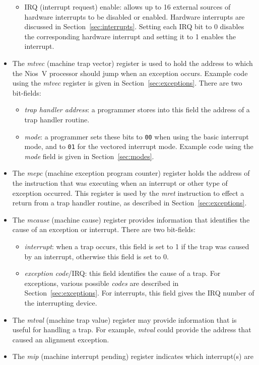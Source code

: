 \documentclass[11pt, twoside, pdftex]{article}
\begin{document}
\begin{itemize}
\begin{itemize}
\item IRQ (interrupt request) enable: allows up to 16 external sources of hardware
interrupts to be disabled or enabled. Hardware interrupts are discussed in 
Section~\ref{sec:interrupts}. Setting each IRQ bit to 0 disables the corresponding
hardware interrupt and setting it to 1 enables the interrupt.
\end{itemize}
\item The {\it mtvec} (machine trap vector) register is used to hold the address to which
the Nios~V processor should jump when an exception occurs. Example code using the
{\it mtvec} register is given in Section~\ref{sec:exceptions}.  There are two bit-fields:
\begin{itemize}
\item {\it trap handler address}: a programmer stores into this field the address of a trap
handler routine.
\item {\it mode}: a programmer sets these bits to \texttt{00} when using the basic interrupt
mode, and to \texttt{01} for the vectored interrupt mode. Example code using the
{\it mode} field is given in Section~\ref{sec:modes}.
\end{itemize}
\item The {\it mepc} (machine exception program counter) register holds the address of
the instruction that was executing when an interrupt or other type of exception occurred.
This register is used by the {\it mret} instruction to effect a return from a trap handler
routine, as described in Section~\ref{sec:exceptions}.
\item The {\it mcause} (machine cause) register provides information that identifies the
cause of an exception or interrupt. There are two bit-fields:
\begin{itemize}
\item {\it interrupt}: when a trap occurs, this field is set to 1 if the trap was caused
by an interrupt, otherwise this field is set to 0.
\item {\it exception code}/IRQ: this field identifies the cause of a trap. For exceptions,
various possible {\it codes} are described in Section~\ref{sec:exceptions}. For
interrupts, this field gives the IRQ number of the interrupting device.
\end{itemize}
\item The {\it mtval} (machine trap value) register may provide information that is useful 
for handling a trap. For example, {\it mtval} could provide the address that caused an 
alignment exception.
\item The {\it mip} (machine interrupt pending) register indicates which interrupt(s) are 

\end{itemize}
\end{document}
